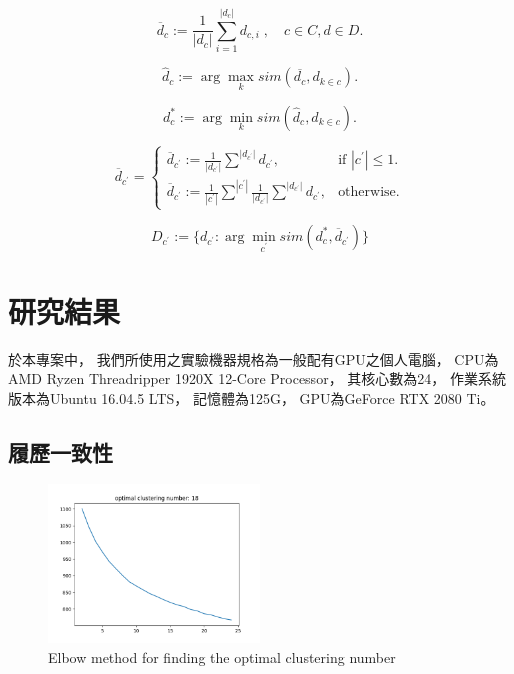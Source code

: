 \documentclass[sigconf]{acmart}
\begin{document}
\begin{equation}
    \label{overline}
    \overline{d}_c := \frac{1}{|d_{c}|}\sum_{i=1}^{|d_{c}|}{d_{c,i}}\;, \quad c\in C, d\in D.
\end{equation}

\begin{equation}
    \label{d_hat}
    \hat{d}_c := \arg \max_{k} sim(\overline{d_{c}}, d_{k \in c}).
\end{equation}

\begin{equation}
    \label{d_star}
    d^{*}_c := \arg \min_{k} sim(\hat{d}_c, d_{k \in c}).
\end{equation}

\begin{equation}
    \label{eq:d_bar}
    \overline{d}_{c^{'}}=\begin{cases}
    \overline{d}_{c^{'}} := \frac{1}{|d_{c^{'}}|}\sum \limits_{}^{|d_{c^{'}}|}{d_{c^{'}}}, & \text{if $|c^{'}| \leq 1$}.\\
    \overline{d}_{c^{'}} := \frac{1}{|c^{'}|} \sum \limits_{}^{|c^{'}|} \frac{1}{|d_{c^{'}}|}\sum \limits_{}^{|d_{c^{'}}|}{d_{c^{'}}}, & \text{otherwise}.
  \end{cases}
\end{equation}

\begin{equation}
    \label{eq:c_dot}
    D_{c^{'}} := \{ d_{c^{'}}  : \arg \min_{c^{'}} sim(d^{*}_{c}, \overline{d}_{c^{'}}) \}
\end{equation}


\section{研究結果}

於本專案中，
我們所使用之實驗機器規格為一般配有GPU之個人電腦，
CPU為AMD Ryzen Threadripper 1920X 12-Core Processor，
其核心數為24，
作業系統版本為Ubuntu 16.04.5 LTS，
記憶體為125G，
GPU為GeForce RTX 2080 Ti。

\subsection{履歷一致性}

\begin{figure}
    \centerline{\includegraphics[width=0.5\textwidth]{elbow_method.png}}
    \caption{Elbow method for finding the optimal clustering number}
    \label{elbow_method}
\end{figure}
\end{document}
